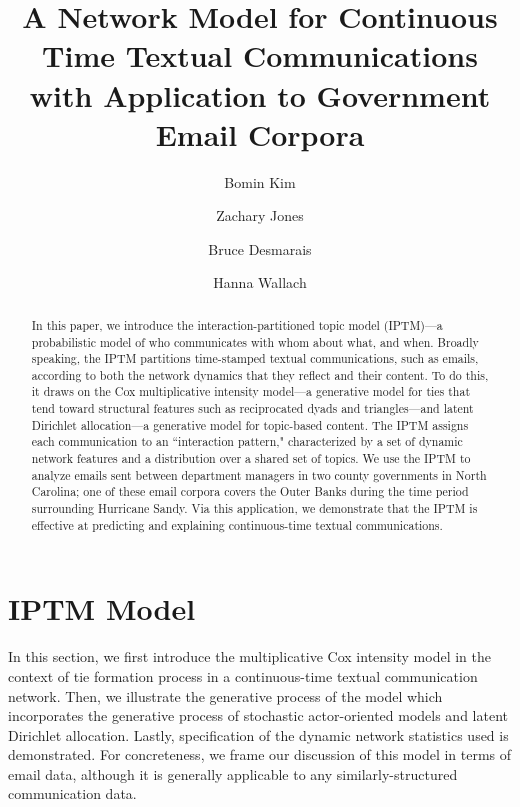 \documentclass[a4paper]{article}
\title{A Network Model for Continuous Time Textual Communications\\ with Application to Government Email Corpora}
\author[1]{Bomin Kim}
\author[1]{Zachary Jones}
\author[1]{Bruce Desmarais}
\author[2,3]{Hanna Wallach}
\affil[1]{Pennsylvania State University}
\affil[2]{Microsoft Research NYC}
\affil[3]{University of Massachusetts Amherst}
\begin{document}
\maketitle
\begin{abstract}
	
	\noindent In this paper, we introduce the interaction-partitioned topic model
	(IPTM)---a probabilistic model of who communicates with whom about
	what, and when. Broadly speaking, the IPTM partitions time-stamped
	textual communications, such as emails, according to both the network
	dynamics that they reflect and their content. To do this, it draws on
	the Cox multiplicative intensity model---a generative model for ties
	that tend toward structural features such as reciprocated dyads and
	triangles---and latent Dirichlet allocation---a generative model for
	topic-based content. The IPTM assigns each communication to an
	``interaction pattern," characterized by a set of dynamic network
	features and a distribution over a shared set of topics. We use the
	IPTM to analyze emails sent between department managers in two county
	governments in North Carolina; one of these email corpora covers the
	Outer Banks during the time period surrounding Hurricane Sandy. Via
	this application, we demonstrate that the IPTM is effective at
	predicting and explaining continuous-time textual communications.	
\end{abstract}
\section{IPTM Model}
In this section, we first introduce the multiplicative Cox intensity model in the context of tie formation process in a continuous-time textual communication network. Then, we illustrate the generative process of the model which incorporates the generative process of stochastic actor-oriented models and latent Dirichlet allocation. Lastly, specification of the dynamic network statistics used is demonstrated. For concreteness, we frame our discussion of this model in terms of email data, although it is generally applicable to any similarly-structured communication data.
\end{document}
